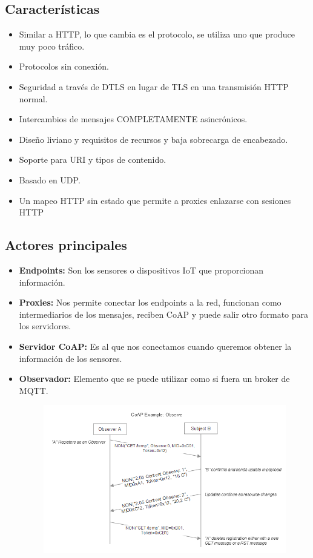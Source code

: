 \documentclass[12pt, twoside, openright]{report} %
\begin{document}
\subsection{Características}
\begin{itemize}
	\item Similar a HTTP, lo que cambia es el protocolo, se utiliza uno que produce muy poco tráfico.
	\item Protocolos sin conexión.
	\item Seguridad a través de DTLS en lugar de TLS en una transmisión HTTP normal.
	\item Intercambios de mensajes COMPLETAMENTE asincrónicos.
	\item Diseño liviano y requisitos de recursos y baja sobrecarga de encabezado.
	\item Soporte para URI y tipos de contenido.
	\item Basado en UDP.
	\item Un mapeo HTTP sin estado que permite a proxies enlazarse con sesiones HTTP
\end{itemize}

\subsection{Actores principales}
\begin{itemize}
	\item \textbf{Endpoints:} Son los sensores o dispositivos IoT que proporcionan información.
	\item \textbf{Proxies:} Nos permite conectar los endpoints a la red, funcionan como intermediarios de los mensajes, reciben CoAP y puede salir otro formato para los servidores.
	\item \textbf{Servidor CoAP:} Es al que nos conectamos cuando queremos obtener la información de los sensores.
	\item \textbf{Observador:} Elemento que se puede utilizar como si fuera un broker de MQTT.
	      \begin{figure}[H]
		      {\includegraphics[scale=.48]{2a2f42a1-0813-4e84-a244-72e6f2667ba8.png}}
	      \end{figure}


\end{itemize}
\end{document}
